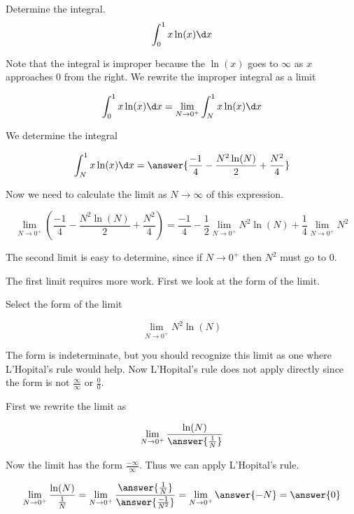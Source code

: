 \documentclass{ximera}
\author{Jason Miller}
\begin{document}
\begin{exercise}
Determine the integral.
\[
\int_{0}^{1} x \ln(x) \d x 
\]

Note that the integral is improper because the $\ln(x)$ goes to $\infty$ as $x$ approaches $0$ from the right. 
We  rewrite the improper integral as a limit

\[
\int_{0}^{1} x\ln(x) \d x=\lim_{N \to 0^{+}} \int_{N}^{1} x\ln(x) \d x 
\]

We determine the integral

\[
\int_{N}^{1} x\ln(x) \d x= \answer{\frac{-1}{4} -\frac{N^{2}\ln(N)}{2}+\frac{N^{2}}{4} }
\]

Now we need to calculate the limit as $N \to \infty$ of this expression. 

\[
\lim_{N \to 0^{+}} \left( \frac{-1}{4} -\frac{N^{2}\ln(N)}{2}+\frac{N^{2}}{4} \right) = \frac{-1}{4} -\frac{1}{2}\lim_{N \to 0^{+}} N^{2} \ln(N) + \frac{1}{4} \lim_{N \to 0^{+}} N^{2}
\]

The second limit is easy to determine, since if $N \to 0^{+}$ then $N^{2}$ must go to $0$. 

The first limit requires more work. First we look at the form of the limit. 

\begin{exercise}
Select the form of the limit 

\[
\lim_{N \to 0^{+}} N^{2} \ln(N)
\] 

\begin{multipleChoice}
\choice{$0 \cdot \infty$}
\choice[correct]{$0\cdot -\infty$}
\choice{$\infty$}
\end{multipleChoice}

\begin{exercise}

The form is indeterminate, but you should recognize this limit as one where  L'Hopital's rule would help. Now
L'Hopital's rule does not apply directly since the form is not $\frac{\infty}{\infty}$ or $\frac{0}{0}$. 

First we rewrite the limit as

\[
\lim_{N \to 0^{+}} \frac{\ln(N)}{\answer{\frac{1}{N}}}
\]

\begin{exercise}
Now the limit has the form $\frac{-\infty}{\infty}$. Thus we can apply L'Hopital's rule. 

\[
\lim_{N \to 0^{+}} \frac{\ln(N)}{\frac{1}{N}} =\lim_{N \to 0^{+}} \frac{\answer{ \frac{1}{N}}}{\answer{\frac{-1}{N^{2}}}}=
\lim_{N \to 0^{+}} \answer{ -N }=\answer{0}
\]


\end{exercise}
\end{exercise}
\end{exercise}
\end{exercise}
\end{document}
